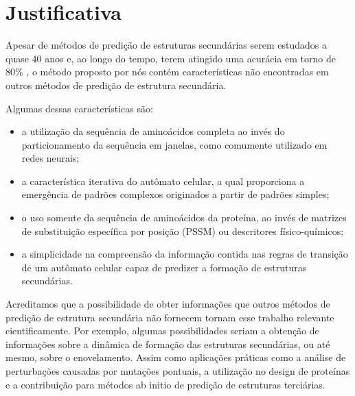 \chapter{Justificativa}


Apesar de métodos de predição de estruturas secundárias serem estudados a quase 40 anos \cite{Chou1977a,Garnier1978} e, ao longo do tempo, terem atingido uma acurácia em torno de 80\% \cite{Faraggi2012a}, o método proposto por nós contém características não encontradas em outros métodos de predição de estrutura secundária.


Algumas dessas características são:

\begin{itemize}
	\item a utilização da sequência de aminoácidos completa ao invés do particionamento da sequência em janelas, como comumente utilizado em redes neurais;
	\item a característica iterativa do autômato celular, a qual proporciona a emergência de padrões complexos originados a partir de padrões simples;
	\item o uso somente da sequência de aminoácidos da proteína, ao invés de matrizes de substituição específica por posição (PSSM) ou descritores físico-químicos;
	\item a simplicidade na compreensão da informação contida nas regras de transição de um autômato celular capaz de predizer a formação de estruturas secundárias. 
\end{itemize}

Acreditamos que a possibilidade de obter informações que outros métodos de predição de estrutura secundária não fornecem tornam esse trabalho relevante cientificamente. Por exemplo, algumas possibilidades seriam a obtenção de informações sobre a dinâmica de formação das estruturas secundárias, ou até mesmo, sobre o enovelamento. Assim como aplicações práticas como a análise de perturbações causadas por mutações pontuais, a utilização no design de proteínas e a contribuição para métodos ab initio de predição de estruturas terciárias.


